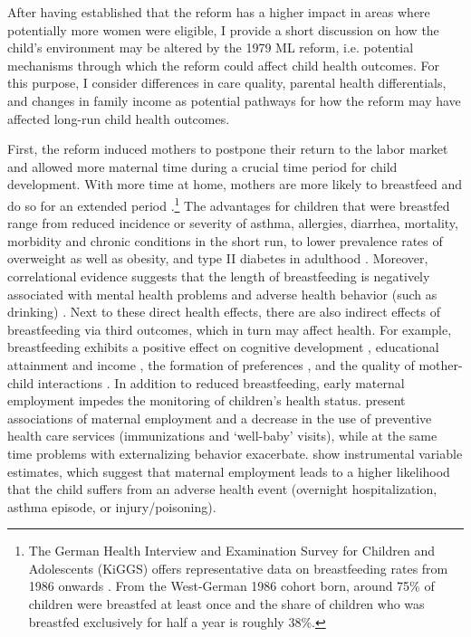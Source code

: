 \documentclass[11pt, a4paper, draft]{article} %
\begin{document}

After having established that the reform has a higher impact in areas where potentially more women were eligible, I provide a short discussion on how the child's environment may be altered by the 1979 ML reform, i.e. potential mechanisms through which the reform could affect child health outcomes. For this purpose, I consider differences in care quality, parental health differentials, and changes in family income as potential pathways for how the reform may have affected long-run child health outcomes.%

First, the reform induced mothers to postpone their return to the labor market and allowed more maternal time during a crucial time period for child development. With more time at home, mothers are more likely to breastfeed and do so for an extended period \citep{baker2008maternal,berger2005earlymaternal}.\footnote{The German Health Interview and Examination Survey for Children and Adolescents (KiGGS) offers representative data on breastfeeding rates from 1986 onwards \citep{lange2007breastfeeding}. From the West-German 1986 cohort born, around 75\% of children were breastfed at least once and the share of children who was breastfed exclusively for half a year is roughly 38\%.} The advantages for children that were breastfed range from reduced incidence or severity of asthma, allergies, diarrhea, mortality, morbidity and chronic conditions in the short run, to lower prevalence rates of overweight as well as obesity, and type II diabetes in adulthood \citep{ruhm2000parental, victora2016breastfeeding}. Moreover, correlational evidence suggests that the length of breastfeeding is negatively associated with mental health problems and adverse health behavior (such as drinking) \citep{oddy2010longterm,falk2016early}. Next to these direct health effects, there are also indirect effects of breastfeeding via third outcomes, which in turn may affect health. For example, breastfeeding exhibits a positive effect on cognitive development \citep{albagli2018}, educational attainment and income \citep{victoria2015association}, the formation of preferences \citep{falk2016early}, and the quality of mother-child interactions \citep{papp2014longitudinal}. In addition to reduced breastfeeding, early maternal employment impedes the monitoring of children's health status. \cite{berger2005earlymaternal} present associations of maternal employment and a decrease in the use of preventive health care services (immunizations and `well-baby' visits), while at the same time problems with externalizing behavior exacerbate. \cite{morrill2011} show instrumental variable estimates, which suggest that maternal employment leads to a higher likelihood that the child suffers from an adverse health event (overnight hospitalization, asthma episode, or injury/poisoning).
\end{document}
